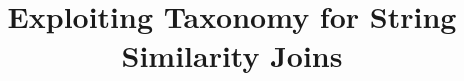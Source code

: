 \documentclass{sig-alternate}
\newcommand{\topkm}{\mbox{top-$k$,$m$}}
\begin{document}


\title{Exploiting Taxonomy for String Similarity Joins}


\author{
}




\maketitle
\end{document}
